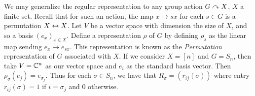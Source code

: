 \documentclass[letterpaper, 11pt, oneside]{book}
\begin{document}
\clearpage

\begin{ex}
  We may generalize the regular representation to any group action $G \curvearrowright X$, $X$ a finite set.
  Recall that for such an action, the map $x \mapsto sx$ for each $s \in G$ is a permutation $X \leftrightarrow X$.
  Let $V$ be a vector space with dimension the size of $X$, and so a basis $(e_{x})_{x \in X}$.
  Define a representation $\rho$ of $G$ by defining $\rho_{s}$ as the linear map sending $e_{x} \mapsto e_{sx}$.
  This representation is known as the \emph{Permutation} representation of $G$ associated with $X$.
  If we consider $X = [n]$ and $G = S_{n}$, then take $V = \mathbb{C}^{n}$ as our vector space and $e_{i}$ as the standard basis vector.
  Then $\rho_{\sigma}(e_{j}) = e_{\sigma_{j}}$.
  Thus for each $\sigma \in S_{n}$, we have that $R_{\sigma} = (r_{ij}(\sigma))$ where entry $r_{ij}(\sigma) = 1$ if $i = \sigma_{j}$ and $0$ otherwise.
\end{ex}

\printbibliography
\end{document}
